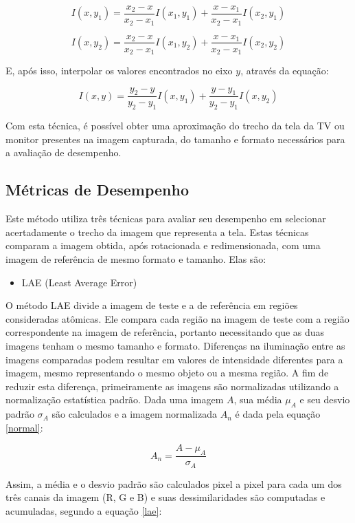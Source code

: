 $$ I(x,y_1) = \frac{x_2-x}{x_2-x_1}I(x_1,y_1) + \frac{x-x_1}{x_2-x_1}I(x_2,y_1) $$

$$ I(x,y_2) = \frac{x_2-x}{x_2-x_1}I(x_1,y_2) + \frac{x-x_1}{x_2-x_1}I(x_2,y_2) $$


E, após isso, interpolar os valores encontrados no eixo $y$, através da equação:

$$ I(x,y) = \frac{y_2-y}{y_2-y_1}I(x,y_1) + \frac{y-y_1}{y_2-y_1}I(x,y_2)$$

Com esta técnica, é possível obter uma aproximação do trecho da tela da TV ou monitor presentes na imagem capturada, do tamanho e formato necessários para a avaliação de desempenho.

\subsection{Métricas de Desempenho}

Este método utiliza três técnicas para avaliar seu desempenho em selecionar acertadamente o trecho da imagem que representa a tela. Estas técnicas comparam a imagem obtida, após rotacionada e redimensionada, com uma imagem de referência de mesmo formato e tamanho. Elas são:
\begin{itemize}
\item LAE (Least Average Error)
\end{itemize}




O método LAE divide a imagem de teste e a de referência em regiões consideradas atômicas. Ele compara cada região na imagem de teste com a região correspondente na imagem de referência, portanto necessitando que as duas imagens tenham o mesmo tamanho e formato. Diferenças na iluminação entre as imagens comparadas podem resultar em valores de intensidade diferentes para a imagem, mesmo representando o mesmo objeto ou a mesma região. A fim de reduzir esta diferença, primeiramente as imagens são normalizadas utilizando a normalização estatística padrão. Dada uma imagem $A$, sua média $\mu_A$ e seu desvio padrão $\sigma_A$ são calculados e a imagem normalizada $A_n$ é dada pela equação \ref{normal}:

\begin{equation}
A_n = \frac{A-\mu_A}{\sigma_A} \label{normal}
\end{equation}

Assim, a média e o desvio padrão são calculados pixel a pixel para cada um dos três canais da imagem (R, G e B) e suas dessimilaridades são computadas e acumuladas, segundo a equação \ref{lae}:

